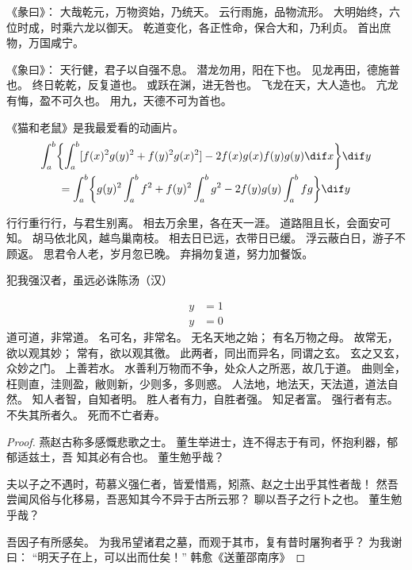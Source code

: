 \documentclass[../Main/thesis.tex]{subfiles}
\begin{document}
《彖曰》：
大哉乾元，万物资始，乃统天。
云行雨施，品物流形。
大明始终，六位时成，时乘六龙以御天。
乾道变化，各正性命，保合大和，乃利贞。
首出庶物，万国咸宁。

《象曰》：
天行健，君子以自强不息。
潜龙勿用，阳在下也。
见龙再田，德施普也。
终日乾乾，反复道也。
或跃在渊，进无咎也。
飞龙在天，大人造也。
亢龙有悔，盈不可久也。
用九，天德不可为首也。

\begin{lemma}
  《猫和老鼠》是我最爱看的动画片。
  \begin{multline*}%
    \int_a^b\biggl\{\int_a^b[f(x)^2g(y)^2+f(y)^2g(x)^2]
    -2f(x)g(x)f(y)g(y)\dif x\biggr\}\dif y \\
    =\int_a^b\biggl\{g(y)^2\int_a^bf^2+f(y)^2
    \int_a^b g^2-2f(y)g(y)\int_a^b fg\biggr\}\dif y
  \end{multline*}
\end{lemma}

行行重行行，与君生别离。
相去万余里，各在天一涯。
道路阻且长，会面安可知。
胡马依北风，越鸟巢南枝。
相去日已远，衣带日已缓。
浮云蔽白日，游子不顾返。
思君令人老，岁月忽已晚。
弃捐勿复道，努力加餐饭。

\begin{theorem}\label{the:theorem1}
  犯我强汉者，虽远必诛\hfill \pozhehao 陈汤（汉）
\end{theorem}
\begin{subequations}
  \begin{align}
    y & = 1 \\
    y & = 0
  \end{align}
\end{subequations}
道可道，非常道。
名可名，非常名。
无名天地之始；
有名万物之母。
故常无，欲以观其妙；
常有，欲以观其徼。
此两者，同出而异名，同谓之玄。
玄之又玄，众妙之门。
上善若水。
水善利万物而不争，处众人之所恶，故几于道。
曲则全，枉则直，洼则盈，敝则新，少则多，多则惑。
人法地，地法天，天法道，道法自然。
知人者智，自知者明。
胜人者有力，自胜者强。
知足者富。
强行者有志。
不失其所者久。
死而不亡者寿。

\begin{proof}
  燕赵古称多感慨悲歌之士。
  董生举进士，连不得志于有司，怀抱利器，郁郁适兹土，吾  知其必有合也。
  董生勉乎哉？

  夫以子之不遇时，苟慕义强仁者，皆爱惜焉，矧燕、赵之士出乎其性者哉！
  然吾尝闻风俗与化移易，吾恶知其今不异于古所云邪？
  聊以吾子之行卜之也。
  董生勉乎哉？

  吾因子有所感矣。
  为我吊望诸君之墓，而观于其市，复有昔时屠狗者乎？
  为我谢曰：
  “明天子在上，可以出而仕矣！”
  \hfill\pozhehao 韩愈《送董邵南序》
\end{proof}
\end{document}
